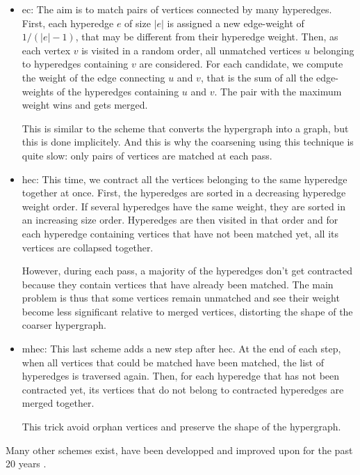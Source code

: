 \documentclass[11pt,a4paper]{report} %
\theoremstyle{customdef}
\begin{document}
\begin{itemize}
	\item \gls{ec}: The aim is to match pairs of vertices connected by many hyperedges.
	First, each hyperedge $e$ of size $|e|$ is assigned a new edge-weight of $1/(|e|-1)$, that may be different from their hyperedge weight.
	Then, as each vertex $v$ is visited in a random order, all unmatched vertices $u$ belonging to hyperedges containing $v$ are considered.
	For each candidate, we compute the weight of the edge connecting $u$ and $v$, that is the sum of all the edge-weights of the hyperedges containing $u$ and $v$.
	The pair with the maximum weight wins and gets merged.

	This is similar to the scheme that converts the hypergraph into a graph, but this is done implicitely.
	And this is why the coarsening using this technique is quite slow: only pairs of vertices are matched at each pass.
	\item \gls{hec}: This time, we contract all the vertices belonging to the same hyperedge together at once.
	First, the hyperedges are sorted in a decreasing hyperedge weight order.
	If several hyperedges have the same weight, they are sorted in an increasing size order.
	Hyperedges are then visited in that order and for each hyperedge containing vertices that have not been matched yet, all its vertices are collapsed together.

	However, during each pass, a majority of the hyperedges don't get contracted because they contain vertices that have already been matched.
	The main problem is thus that some vertices remain unmatched and see their weight become less significant relative to merged vertices, distorting the shape of the coarser hypergraph.
	\item \gls{mhec}: This last scheme adds a new step after \gls{hec}.
	At the end of each step, when all vertices that could be matched have been matched, the list of hyperedges is traversed again.
	Then, for each hyperedge that has not been contracted yet, its vertices that do not belong to contracted hyperedges are merged together.

	This trick avoid orphan vertices and preserve the shape of the hypergraph.
\end{itemize}

Many other schemes exist, have been developped and improved upon for the past 20 years \citep{Aykanat2008, Karypis1995b, Lotfifar2015, Monien2000}.
\end{document}
